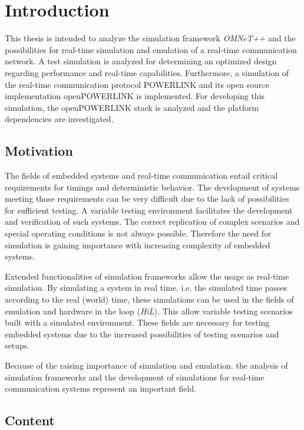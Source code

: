 \chapter{Introduction}
\label{cha:introduction}
This thesis is intended to analyze the simulation framework \emph{OMNeT++} \cite{omnet_manual} and the possibilities for real-time simulation and emulation of a real-time communication network.
A test simulation is analyzed for determining an optimized design regarding performance and real-time capabilities.
Furthermore, a simulation of the real-time communication protocol POWERLINK and its open source implementation \mbox{openPOWERLINK} \cite{openpowerlink} is implemented. 
For developing this simulation, the openPOWERLINK stack is analyzed and the platform dependencies are investigated.

\section{Motivation}
The fields of embedded systems and real-time communication entail critical requirements for timings and deterministic behavior.
The development of systems meeting those requirements can be very difficult due to the lack of possibilities for sufficient testing.
A variable testing environment facilitates the development and verification of such systems.
The correct replication of complex scenarios and special operating conditions is not always possible.
Therefore the need for simulation is gaining importance with increasing complexity of embedded systems.

Extended functionalities of simulation frameworks allow the usage as real-time simulation.
By simulating a system in real time, i.e. the simulated time passes according to the real (world) time, these simulations can be used in the fields of emulation and hardware in the loop (\emph{HiL}).
This allow variable testing scenarios built with a simulated environment.
These fields are necessary for testing embedded systems due to the increased possibilities of testing scenarios and setups.

Because of the raising importance of simulation and emulation. the analysis of simulation frameworks and the development of simulations for real-time communication systems represent an important field.

\section{Content}

